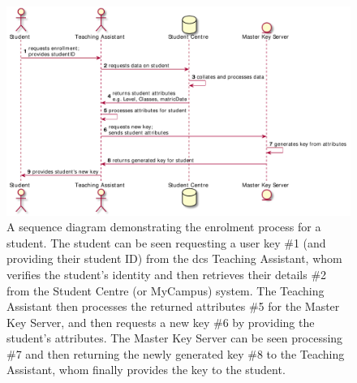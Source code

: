 \begin{figure}
    \centering
    \includegraphics[width=\linewidth,keepaspectratio]{images/flow_of_info/enrollment_stu_sequence.pdf}

    \caption{A sequence diagram demonstrating the enrolment process for a student.
    The student can be seen requesting a user key \#1 (and providing their student ID) from the \acrshort{dcs} Teaching Assistant, whom verifies the student's identity and then retrieves their details \#2 from the Student Centre (or MyCampus) system. The Teaching Assistant then processes the returned attributes \#5 for the Master Key Server, and then requests a new key \#6 by providing the student's attributes. The Master Key Server can be seen processing \#7 and then returning the newly generated key \#8 to the Teaching Assistant, whom finally provides the key to the student.}

    \label{fig:enrolment_diagram}
\end{figure}
